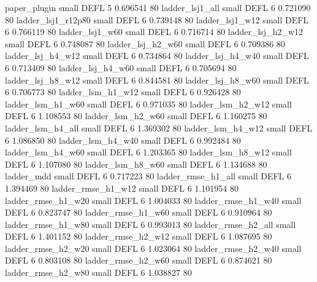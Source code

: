             paper_plugin      small     DEFL                 5 0.696541 80
         ladder_lsj1_all      small     DEFL                 6 0.721090 80
      ladder_lsj1_r12p80      small     DEFL                 6 0.739148 80
         ladder_lsj1_w12      small     DEFL                 6 0.766119 80
         ladder_lsj1_w60      small     DEFL                 6 0.716714 80
       ladder_lsj_h2_w12      small     DEFL                 6 0.748087 80
       ladder_lsj_h2_w60      small     DEFL                 6 0.709386 80
       ladder_lsj_h4_w12      small     DEFL                 6 0.734864 80
       ladder_lsj_h4_w40      small     DEFL                 6 0.713409 80
       ladder_lsj_h4_w60      small     DEFL                 6 0.705694 80
       ladder_lsj_h8_w12      small     DEFL                 6 0.844581 80
       ladder_lsj_h8_w60      small     DEFL                 6 0.706773 80
       ladder_lsm_h1_w12      small     DEFL                 6 0.926428 80
       ladder_lsm_h1_w60      small     DEFL                 6 0.971035 80
       ladder_lsm_h2_w12      small     DEFL                 6 1.108553 80
       ladder_lsm_h2_w60      small     DEFL                 6 1.160275 80
       ladder_lsm_h4_all      small     DEFL                 6 1.369302 80
       ladder_lsm_h4_w12      small     DEFL                 6 1.086850 80
       ladder_lsm_h4_w40      small     DEFL                 6 0.992484 80
       ladder_lsm_h4_w60      small     DEFL                 6 1.203365 80
       ladder_lsm_h8_w12      small     DEFL                 6 1.107080 80
       ladder_lsm_h8_w60      small     DEFL                 6 1.134688 80
              ladder_mdd      small     DEFL                 6 0.717223 80
      ladder_rmse_h1_all      small     DEFL                 6 1.394469 80
      ladder_rmse_h1_w12      small     DEFL                 6 1.101954 80
      ladder_rmse_h1_w20      small     DEFL                 6 1.004033 80
      ladder_rmse_h1_w40      small     DEFL                 6 0.823747 80
      ladder_rmse_h1_w60      small     DEFL                 6 0.910964 80
      ladder_rmse_h1_w80      small     DEFL                 6 0.993013 80
      ladder_rmse_h2_all      small     DEFL                 6 1.401152 80
      ladder_rmse_h2_w12      small     DEFL                 6 1.087695 80
      ladder_rmse_h2_w20      small     DEFL                 6 1.023064 80
      ladder_rmse_h2_w40      small     DEFL                 6 0.803108 80
      ladder_rmse_h2_w60      small     DEFL                 6 0.874621 80
      ladder_rmse_h2_w80      small     DEFL                 6 1.038827 80
